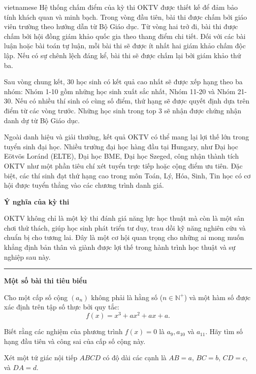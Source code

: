 \documentclass{article}
\begin{document}
\begin{otherlanguage*}{vietnamese}
Hệ thống chấm điểm của kỳ thi OKTV được thiết kế để đảm bảo tính khách quan và minh bạch. Trong vòng đầu tiên, bài thi được chấm bởi giáo viên trường theo hướng dẫn từ Bộ Giáo dục.
Từ vòng hai trở đi, bài thi được chấm bởi hội đồng giám khảo quốc gia theo thang điểm chi tiết. Đối với các bài luận hoặc bài toán tự luận, mỗi bài thi sẽ được ít nhất hai giám khảo chấm độc lập.
Nếu có sự chênh lệch đáng kể, bài thi sẽ được chấm lại bởi giám khảo thứ ba.

Sau vòng chung kết, 30 học sinh có kết quả cao nhất sẽ được xếp hạng theo ba nhóm: Nhóm 1-10 gồm những học sinh xuất sắc nhất, Nhóm 11-20 và Nhóm 21-30.
Nếu có nhiều thí sinh có cùng số điểm, thứ hạng sẽ được quyết định dựa trên điểm từ các vòng trước. Những học sinh trong top 3 sẽ nhận được chứng nhận danh dự từ Bộ Giáo dục.

Ngoài danh hiệu và giải thưởng, kết quả OKTV có thể mang lại lợi thế lớn trong tuyển sinh đại học.
Nhiều trường đại học hàng đầu tại Hungary, như Đại học Eötvös Loránd (ELTE), Đại học BME, Đại học Szeged,
công nhận thành tích OKTV như một phần tiêu chí xét tuyển trực tiếp hoặc cộng điểm ưu tiên.
Đặc biệt, các thí sinh đạt thứ hạng cao trong môn Toán, Lý, Hóa, Sinh, Tin học có cơ hội được tuyển thẳng vào các chương trình danh giá.

\textbf{Ý nghĩa của kỳ thi}

OKTV không chỉ là một kỳ thi đánh giá năng lực học thuật mà còn là một sân chơi thử thách, giúp học sinh phát triển tư duy, trau dồi kỹ năng nghiên cứu và chuẩn bị cho tương lai.
Đây là một cơ hội quan trọng cho những ai mong muốn khẳng định bản thân và giành được lợi thế trong hành trình học thuật và sự nghiệp sau này.

\bigbreak

\noindent\rule{16.5cm}{0.4pt}

\textbf{Một số bài thi tiêu biểu}

\bigbreak

\begin{problem*}
    Cho một cấp số cộng \( (a_n) \) không phải là hằng số (\( n \in \mathbb{N}^+ \)) và một hàm số được xác định trên tập số thực bởi quy tắc:
    \[
        f(x) = x^3 + a x^2 + a x + a.
    \]
    
    Biết rằng các nghiệm của phương trình \( f(x) = 0 \) là \( a_9, a_{10} \) và \( a_{11} \). Hãy tìm số hạng đầu tiên và công sai của cấp số cộng này.
\end{problem*}

\begin{problem*}
    Xét một tứ giác nội tiếp \( ABCD \) có độ dài các cạnh là \( AB = a \), \( BC = b \), \( CD = c \), và \( DA = d \).  
    

\end{problem*}
\end{otherlanguage*}
\end{document}
